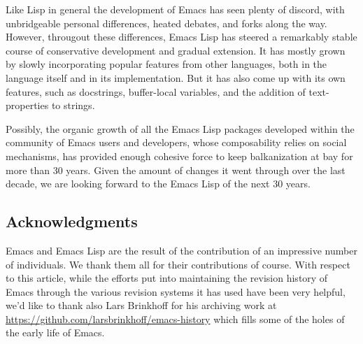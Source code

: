 \documentclass[format=acmsmall, review]{acmart}
\newcommand \Elisp {Emacs Lisp}
\begin{document}
Like Lisp in general the development of Emacs has seen plenty of
discord, with unbridgeable personal differences, heated debates, and
forks along the way.  However, througout these differences, \Elisp{}
has steered a remarkably stable course of conservative development and
gradual extension.  It has mostly grown by slowly incorporating popular
features from other languages, both in the language itself and in its
implementation.  But it has also come up with its own features, such as
docstrings, buffer-local variables, and the addition of text-properties
to strings.

Possibly, the organic growth of all the \Elisp{} packages developed within
the community of Emacs users and developers, whose composability relies on
social mechanisms, has provided enough cohesive force to keep balkanization
at bay for more than 30 years.  Given the amount of changes it went through
over the last decade, we are looking forward to the \Elisp{} of the next
30 years.


\subsection{Acknowledgments}

Emacs and \Elisp{} are the result of the contribution of an impressive
number of individuals.  We thank them all for their contributions of course.
With respect to this article, while the efforts put into maintaining the
revision history of Emacs through the various revision systems it has used
have been very helpful, we'd like to thank also Lars Brinkhoff for his
archiving work at \url{https://github.com/larsbrinkhoff/emacs-history} which
fills some of the holes of the early life of Emacs.



\end{document}

